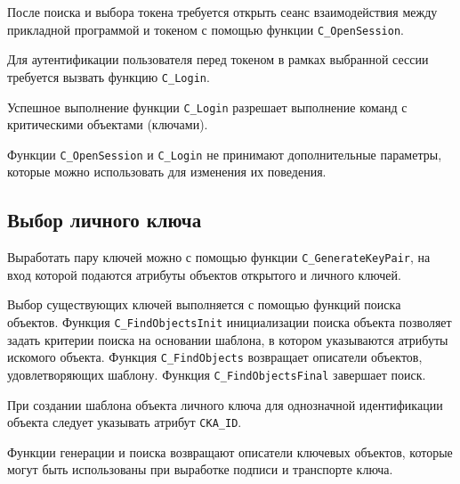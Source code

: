 После поиска и выбора токена требуется открыть сеанс
взаимодействия между прикладной программой и токеном с
помощью функции \verb|C_OpenSession|.

Для аутентификации пользователя перед токеном в рамках
выбранной сессии требуется вызвать функцию \verb|C_Login|.

Успешное выполнение функции \verb|C_Login| разрешает
выполнение команд с критическими объектами (ключами).

Функции \verb|C_OpenSession| и \verb|C_Login| не принимают
дополнительные параметры, которые можно использовать для
изменения их поведения.


\subsection{Выбор личного ключа}

Выработать пару ключей можно с помощью функции
\verb|C_GenerateKeyPair|, на вход которой подаются атрибуты
объектов открытого и личного ключей.

Выбор существующих ключей выполняется с помощью функций
поиска объектов. Функция \verb|C_FindObjectsInit| инициализации
поиска объекта позволяет задать критерии поиска на основании
шаблона, в котором указываются атрибуты искомого объекта.
Функция \verb|C_FindObjects| возвращает описатели объектов,
удовлетворяющих шаблону. Функция \verb|C_FindObjectsFinal|
завершает поиск.

При создании шаблона объекта личного ключа для однозначной
идентификации объекта следует указывать атрибут \verb|CKA_ID|.

Функции генерации и поиска возвращают описатели ключевых
объектов, которые могут быть использованы при выработке подписи
и транспорте ключа.



